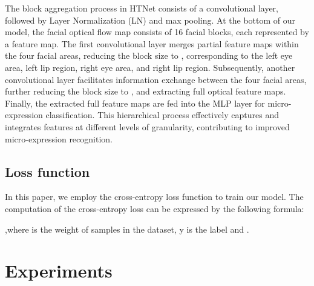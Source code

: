 \documentclass[review,12pt, 3p]{elsarticle}
\begin{document}
The block aggregation process in HTNet consists of a  convolutional layer, followed by Layer Normalization (LN) and  max pooling. At the bottom of our model, the facial optical flow map consists of 16 facial blocks, each represented by a  feature map. The first  convolutional layer merges partial feature maps within the four facial areas, reducing the block size to , corresponding to the left eye area, left lip region, right eye area, and right lip region. Subsequently, another  convolutional layer facilitates information exchange between the four facial areas, further reducing the block size to , and extracting full optical feature maps. Finally, the extracted full feature maps are fed into the MLP layer for micro-expression classification. This hierarchical process effectively captures and integrates features at different levels of granularity, contributing to improved micro-expression recognition.\\
\subsection{Loss function}
In this paper, we employ the cross-entropy loss function to train our model. The computation of the cross-entropy loss  can be expressed by the following formula:
 
,where  is the weight of samples in the dataset, y is the label and .
\\
\section{Experiments}
\end{document}

